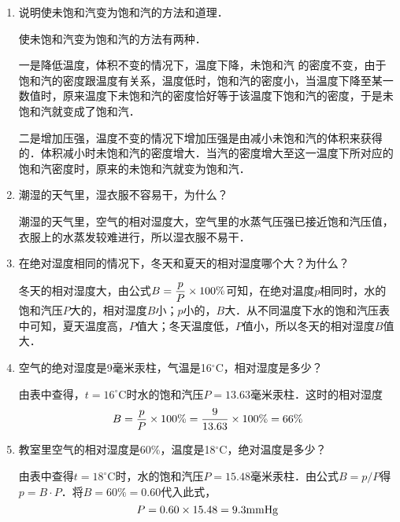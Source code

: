 \begin{enumerate}
	\item 说明使未饱和汽变为饱和汽的方法和道理．
    
  \begin{solution}
使未饱和汽变为饱和汽的方法有两种．

一是降低温度，体积不变的情况下，温度下降，未饱和汽
的密度不变，由于饱和汽的密度跟温度有关系，温度低时，饱和汽的密度小，当温度下降至某一数值时，原来温度下未饱和汽的密度恰好等于该温度下饱和汽的密度，于是未饱和汽就变成了饱和汽．

二是增加压强，温度不变的情况下增加压强是由减小未饱和汽的体积来获得的．体积减小时未饱和汽的密度增大．当汽的密度增大至这一温度下所对应的饱和汽密度时，原来的未饱和汽就变为饱和汽．
  \end{solution}
\item 潮湿的天气里，湿衣服不容易干，为什么？
    
\begin{solution}
  潮湿的天气里，空气的相对湿度大，空气里的水蒸气压强已接近饱和汽压值，衣服上的水蒸发较难进行，所以湿衣服不易干．
\end{solution}
\item 在绝对湿度相同的情况下，冬天和夏天的相对湿度哪个大？为什么？
    
\begin{solution}
冬天的相对湿度大，由公式$B=\dfrac{p}{P}\times 100\%$可知，在绝对温度$p$相同时，水的饱和汽压$P$大的，相对湿度$B$小；$p$小的，$B$大．从不同温度下水的饱和汽压表中可知，夏天温度高，$P$值大；冬天温度低，$P$值小，所以冬天的相对湿度$B$值大．
\end{solution}
\item 空气的绝对湿度是9毫米汞柱，气温是16$^\circ$C，相对湿度是多少？
    
\begin{solution}
由表中查得，$t=16^{\circ}$C时水的饱和汽压$P=13.63$毫米汞柱．这时的相对湿度
\[B=\frac{p}{P}\times100\%=\frac{9}{13.63}\times100\%=66\%\]
\end{solution}
\item 教室里空气的相对湿度是60\%，温度是18$^\circ$C，绝对温度是多少？
    
\begin{solution}
  由表中查得$t=18^{\circ}$C时，水的饱和汽压$P=15.48$毫米汞柱．由公式$B=p/P$得$p=B\cdot P$．将$B=60\%=0.60$代入此式，
  \[P=0.60\times15.48=9.3{\rm mmHg}\]
\end{solution}
\end{enumerate}



